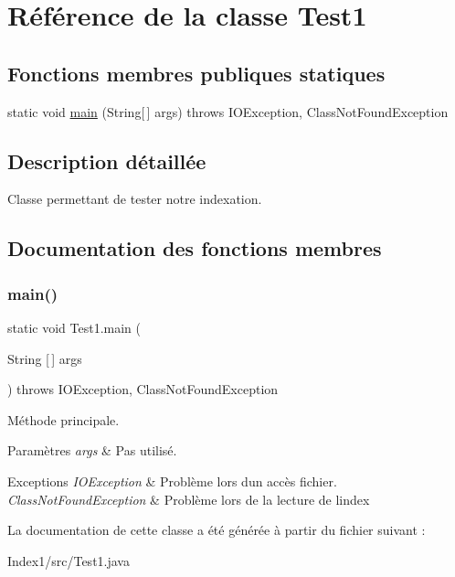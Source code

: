 \hypertarget{classTest1}{}\section{Référence de la classe Test1}
\label{classTest1}
\subsection*{Fonctions membres publiques statiques}
\begin{DoxyCompactItemize}
\item 
static void \hyperlink{classTest1_a63b52180769a29aff9dbd46c09cdf70b}{main} (String\mbox{[}$\,$\mbox{]} args)  throws I\+O\+Exception, Class\+Not\+Found\+Exception 	
\end{DoxyCompactItemize}


\subsection{Description détaillée}
Classe permettant de tester notre indexation. 

\subsection{Documentation des fonctions membres}
\mbox{\label{classTest1_a63b52180769a29aff9dbd46c09cdf70b}} 
\subsubsection{\texorpdfstring{main()}{main()}}
{\footnotesize\ttfamily static void Test1.\+main (\begin{DoxyParamCaption}\item[{String \mbox{[}$\,$\mbox{]}}]{args }\end{DoxyParamCaption}) throws I\+O\+Exception, Class\+Not\+Found\+Exception\hspace{0.3cm}{\ttfamily [static]}}

Méthode principale.


\begin{DoxyParams}{Paramètres}
{\em args} & Pas utilisé.\\
\hline
\end{DoxyParams}

\begin{DoxyExceptions}{Exceptions}
{\em I\+O\+Exception} & Problème lors d\textquotesingle{}un accès fichier. \\
\hline
{\em Class\+Not\+Found\+Exception} & Problème lors de la lecture de l\textquotesingle{}index \\
\hline
\end{DoxyExceptions}


La documentation de cette classe a été générée à partir du fichier suivant \+:\begin{DoxyCompactItemize}
\item 
Index1/src/Test1.\+java\end{DoxyCompactItemize}
